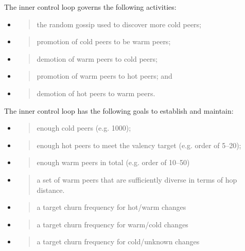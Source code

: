 \documentclass[]{article}
\begin{document}
The inner control loop governs the following activities:

\begin{itemize}
\item
  \begin{quote}
  the random gossip used to discover more cold peers;
  \end{quote}
\item
  \begin{quote}
  promotion of cold peers to be warm peers;
  \end{quote}
\item
  \begin{quote}
  demotion of warm peers to cold peers;
  \end{quote}
\item
  \begin{quote}
  promotion of warm peers to hot peers; and
  \end{quote}
\item
  \begin{quote}
  demotion of hot peers to warm peers.
  \end{quote}
\end{itemize}

The inner control loop has the following goals to establish and
maintain:

\begin{itemize}
\item
  \begin{quote}
  enough cold peers (e.g. 1000);
  \end{quote}
\item
  \begin{quote}
  enough hot peers to meet the valency target (e.g. order of 5--20);
  \end{quote}
\item
  \begin{quote}
  enough warm peers in total (e.g. order of 10--50)
  \end{quote}
\item
  \begin{quote}
  a set of warm peers that are sufficiently diverse in terms of hop
  distance.
  \end{quote}
\item
  \begin{quote}
  a target churn frequency for hot/warm changes
  \end{quote}
\item
  \begin{quote}
  a target churn frequency for warm/cold changes
  \end{quote}
\item
  \begin{quote}
  a target churn frequency for cold/unknown changes
  \end{quote}
\end{itemize}
\end{document}

